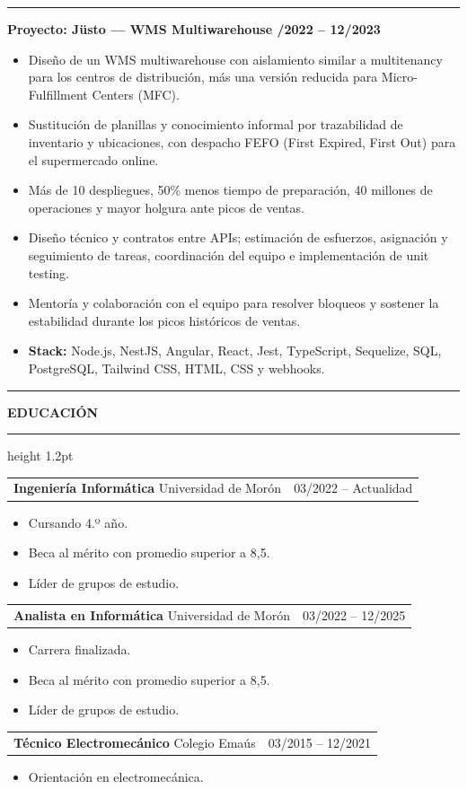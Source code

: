 \documentclass[11pt,letterpaper]{article}
\makeatletter
\newcommand{\cvsection}[1]{%
  \Needspace{4\baselineskip}%
  \vspace{0.55em}%
  \noindent
  {\color{accent}\rule[-0.18em]{3pt}{1.25em}}%
  \hspace{0.45em}%
  {\large\bfseries\color{accentdark}\MakeUppercase{#1}}%
  \hspace{0.55em}%
  {\color{accentlight}\leaders\hrule height 1.2pt\hfill\kern0pt}\par
  \vspace{0.28em}%
}
\newcommand{\cventry}[3]{%
  \begin{tabularx}{\textwidth}{@{}Xr@{}}
    \textbf{\color{accentdark}#1} \textcolor{muted}{\textbar}\enspace #2
    & \small\textcolor{muted}{#3}
  \end{tabularx}
}
\newcommand{\project}[1]{%
  \Needspace{6\baselineskip}%
  \vspace{0.3em}%
  {\color{accent}\rule[0.18em]{0.45em}{0.45em}}\hspace{0.4em}%
  \textbf{\color{accentdark}Proyecto: #1}\par
}
\makeatother
\begin{document}
\project{Jüsto --- WMS Multiwarehouse
  \textnormal{\small\textcolor{muted}{\enspace 11/2022 -- 12/2023}}}
\begin{itemize}
  \item Diseño de un WMS multiwarehouse con aislamiento similar a multitenancy para los
    centros de distribución, más una versión reducida para Micro-Fulfillment Centers (MFC).
  \item Sustitución de planillas y conocimiento informal por trazabilidad de inventario y
    ubicaciones, con despacho FEFO (First Expired, First Out) para el supermercado online.
  \item Más de 10 despliegues, 50\% menos tiempo de preparación, 40 millones de operaciones
    y mayor holgura ante picos de ventas.
  \item Diseño técnico y contratos entre APIs; estimación de esfuerzos, asignación y
    seguimiento de tareas, coordinación del equipo e implementación de unit testing.
  \item Mentoría y colaboración con el equipo para resolver bloqueos y sostener la
    estabilidad durante los picos históricos de ventas.
  \item \textbf{Stack:} Node.js, NestJS, Angular, React, Jest, TypeScript,
    Sequelize, SQL, PostgreSQL, Tailwind CSS, HTML, CSS y webhooks.
\end{itemize}

\newpage
\cvsection{Educación}

\cventry{Ingeniería Informática}{Universidad de Morón}{03/2022 -- Actualidad}
\begin{itemize}
  \item Cursando 4.º año.
  \item Beca al mérito con promedio superior a 8,5.
  \item Líder de grupos de estudio.
\end{itemize}

\cventry{Analista en Informática}{Universidad de Morón}{03/2022 -- 12/2025}
\begin{itemize}
  \item Carrera finalizada.
  \item Beca al mérito con promedio superior a 8,5.
  \item Líder de grupos de estudio.
\end{itemize}

\cventry{Técnico Electromecánico}{Colegio Emaús}{03/2015 -- 12/2021}
\begin{itemize}
  \item Orientación en electromecánica.
\end{itemize}
\end{document}

